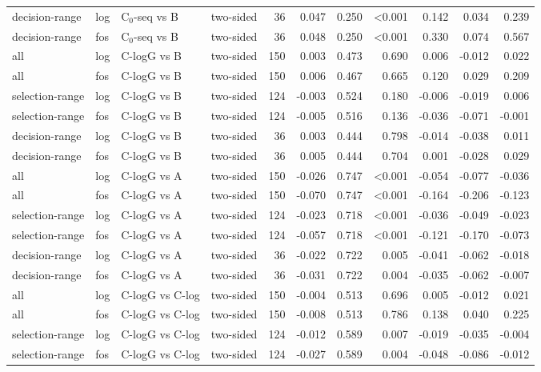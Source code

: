 \begin{longtable}{llllrrrrrrr}
decision-range & log & C$_0$-seq vs B & two-sided & 36 & 0.047 & 0.250 & <0.001 & 0.142 & 0.034 & 0.239 \\
decision-range & fos & C$_0$-seq vs B & two-sided & 36 & 0.048 & 0.250 & <0.001 & 0.330 & 0.074 & 0.567 \\
all & log & C-logG vs B & two-sided & 150 & 0.003 & 0.473 & 0.690 & 0.006 & -0.012 & 0.022 \\
all & fos & C-logG vs B & two-sided & 150 & 0.006 & 0.467 & 0.665 & 0.120 & 0.029 & 0.209 \\
selection-range & log & C-logG vs B & two-sided & 124 & -0.003 & 0.524 & 0.180 & -0.006 & -0.019 & 0.006 \\
selection-range & fos & C-logG vs B & two-sided & 124 & -0.005 & 0.516 & 0.136 & -0.036 & -0.071 & -0.001 \\
decision-range & log & C-logG vs B & two-sided & 36 & 0.003 & 0.444 & 0.798 & -0.014 & -0.038 & 0.011 \\
decision-range & fos & C-logG vs B & two-sided & 36 & 0.005 & 0.444 & 0.704 & 0.001 & -0.028 & 0.029 \\
all & log & C-logG vs A & two-sided & 150 & -0.026 & 0.747 & <0.001 & -0.054 & -0.077 & -0.036 \\
all & fos & C-logG vs A & two-sided & 150 & -0.070 & 0.747 & <0.001 & -0.164 & -0.206 & -0.123 \\
selection-range & log & C-logG vs A & two-sided & 124 & -0.023 & 0.718 & <0.001 & -0.036 & -0.049 & -0.023 \\
selection-range & fos & C-logG vs A & two-sided & 124 & -0.057 & 0.718 & <0.001 & -0.121 & -0.170 & -0.073 \\
decision-range & log & C-logG vs A & two-sided & 36 & -0.022 & 0.722 & 0.005 & -0.041 & -0.062 & -0.018 \\
decision-range & fos & C-logG vs A & two-sided & 36 & -0.031 & 0.722 & 0.004 & -0.035 & -0.062 & -0.007 \\
all & log & C-logG vs C-log & two-sided & 150 & -0.004 & 0.513 & 0.696 & 0.005 & -0.012 & 0.021 \\
all & fos & C-logG vs C-log & two-sided & 150 & -0.008 & 0.513 & 0.786 & 0.138 & 0.040 & 0.225 \\
selection-range & log & C-logG vs C-log & two-sided & 124 & -0.012 & 0.589 & 0.007 & -0.019 & -0.035 & -0.004 \\
selection-range & fos & C-logG vs C-log & two-sided & 124 & -0.027 & 0.589 & 0.004 & -0.048 & -0.086 & -0.012 \\

\end{longtable}
